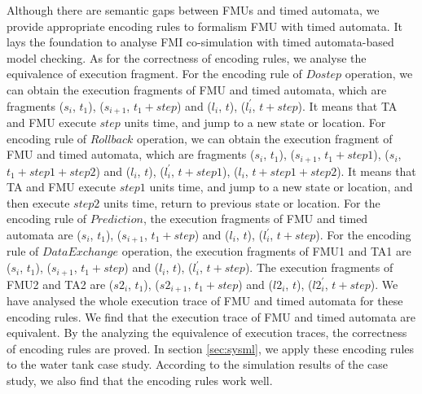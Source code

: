Although there are semantic gaps between FMUs and timed automata, we provide appropriate encoding rules to formalism FMU with timed automata. It lays the foundation to analyse FMI co-simulation with timed automata-based model checking. 
As for the correctness of encoding rules, we analyse the equivalence of execution fragment. For the encoding rule of $Dostep$ operation, we can obtain the execution fragments of FMU and timed automata, which are fragments ($s_{i}$, $t_{1}$), ($s_{i+1}$, $t_{1}+step$) and ($l_{i}$, $t$), ($l_{i}^{\prime}$, $t+step$). It means that TA and FMU execute $step$ units time, and jump to a new state or location.  For encoding rule of $Rollback$ operation, we can obtain the execution fragment of FMU and timed automata, which are fragments ($s_{i}$, $t_{1}$), ($s_{i+1}$, $t_{1}+step1$), ($s_{i}$, $t_{1}+step1+step2$) and ($l_{i}$, $t$), ($l_{i}^{\prime}$, $t+step1$), ($l_{i}$, $t+step1+step2$). It means that TA and FMU execute $step1$ units time, and jump to a new state or location, and then execute $step2$ units time, return to previous state or location. For the encoding rule of $Prediction$, the execution fragments of FMU and timed automata are ($s_{i}$, $t_{1}$), ($s_{i+1}$, $t_{1}+step$) and ($l_{i}$, $t$), ($l_{i}^{\prime}$, $t+step$). For the encoding rule of $Data Exchange$ operation, the execution fragments of FMU1 and TA1 are ($s_{i}$, $t_{1}$), ($s_{i+1}$, $t_{1}+step$) and ($l_{i}$, $t$), ($l_{i}^{\prime}$, $t+step$). The execution fragments of FMU2 and TA2 are  ($s2_{i}$, $t_{1}$), ($s2_{i+1}$, $t_{1}+step$) and ($l2_{i}$, $t$), ($l2_{i}^{\prime}$, $t+step$). We have  analysed the whole execution trace of FMU and timed automata for these encoding rules. We find that the execution trace of FMU and timed automata are equivalent. By the analyzing the equivalence of execution traces, the correctness of encoding rules are proved. In section \ref{sec:sysml}, we apply these encoding rules to the water tank case study. According to the simulation results of the case study, we also find that the encoding rules work well.